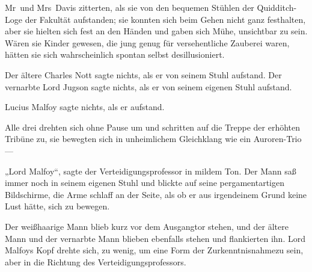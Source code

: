 \later

Mr~und Mrs~Davis zitterten, als sie von den bequemen Stühlen der Quidditch-Loge der Fakultät aufstanden; sie konnten sich beim Gehen nicht ganz festhalten, aber sie hielten sich fest an den Händen und gaben sich Mühe, unsichtbar zu sein. Wären sie Kinder gewesen, die jung genug für versehentliche Zauberei waren, hätten sie sich wahrscheinlich spontan selbst desillusioniert.

Der ältere Charles Nott sagte nichts, als er von seinem Stuhl aufstand. Der vernarbte Lord Jugson sagte nichts, als er von seinem eigenen Stuhl aufstand.

Lucius Malfoy sagte nichts, als er aufstand.

Alle drei drehten sich ohne Pause um und schritten auf die Treppe der erhöhten Tribüne zu, sie bewegten sich in unheimlichem Gleichklang wie ein Auroren-Trio—

„Lord Malfoy“, sagte der Verteidigungsprofessor in mildem Ton. Der Mann saß immer noch in seinem eigenen Stuhl und blickte auf seine pergamentartigen Bildschirme, die Arme schlaff an der Seite, als ob er aus irgendeinem Grund keine Lust hätte, sich zu bewegen.

Der weißhaarige Mann blieb kurz vor dem Ausgangtor stehen, und der ältere Mann und der vernarbte Mann blieben ebenfalls stehen und flankierten ihn. Lord Malfoys Kopf drehte sich, zu wenig, um eine Form der Zurkenntnisnahmezu sein, aber in die Richtung des Verteidigungsprofessors.

